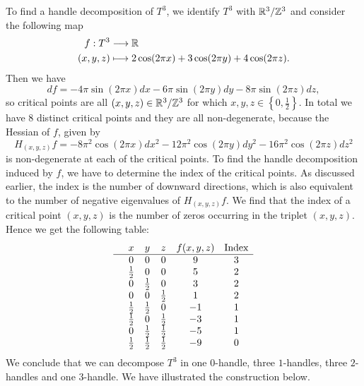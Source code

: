 \begin{eg}[$T^{3} = S^{1} \times S^{1} \times S^{1}$]
    \label{eg:handle-decomposition-three-torus}
    To find a handle decomposition of $T^3$, we identify $T^{3}$ with $\mathbb{R}^3 / \mathbb{Z}^{3}$ and consider the following map
    \begin{align*}
        f: T^{3} &\longrightarrow \mathbb{R} \\
        (x, y, z) &\longmapsto 2\cos (2 \pi x) + 3\cos ( 2 \pi y) + 4 \cos(2 \pi z)
    .\end{align*}
    Then we have
    \[
        df =
        -4\pi \sin (2 \pi x) dx
        -6 \pi \sin ( 2 \pi y) dy
        - 8 \pi \sin(2 \pi z) dz
    ,\] 
    so critical points are all $(x, y, z) \in \mathbb{R}^3 / \mathbb{Z}^3$ for which  $x, y, z \in \left\{0, \frac{1}{2} \right\}$.
    In total we have $8$ distinct critical points and they are all non-degenerate, because the Hessian of $f$, given by
    \[
        H_{(x, y, z)} f =
        - 8 \pi^2  \cos (2 \pi x) dx^2
        -12\pi^2 \cos ( 2 \pi y) dy^2
        -16 \pi^2 \cos(2 \pi z) dz^2
    \] 
    is non-degenerate at each of the critical points.
    To find the handle decomposition induced by $f$, we have to determine the index of the critical points.
    As discussed earlier, the index is the number of downward directions, which is also equivalent to the number of negative eigenvalues of $H_{(x, y, z)}f$.
    We find that the index of a critical point $(x, y, z)$ is the number of zeros occurring in the triplet $(x, y, z)$. Hence we get the following table:
    \[\begin{array}{cccccc}
  & x & y  & z & f(x, y, z) & \text{Index}\\ \hline
  & 0 & 0 & 0 & 9 & 3 \\
& \frac{1}{2} & 0 & 0 & 5 & 2 \\
& 0 & \frac{1}{2} & 0 & 3 & 2 \\
& 0 & 0 & \frac{1}{2} & 1 & 2 \\
& \frac{1}{2} & \frac{1}{2} & 0 & -1 & 1 \\
& \frac{1}{2} & 0 & \frac{1}{2} & -3 & 1 \\
& 0 & \frac{1}{2} & \frac{1}{2} & -5 & 1 \\
& \frac{1}{2} & \frac{1}{2} & \frac{1}{2} & -9 & 0 \\
    \end{array}\]
    We conclude that we can decompose $T^3$ in one $0$-handle, three $1$-handles, three $2$-handles and one $3$-handle. We have illustrated the construction below.


\end{eg}
